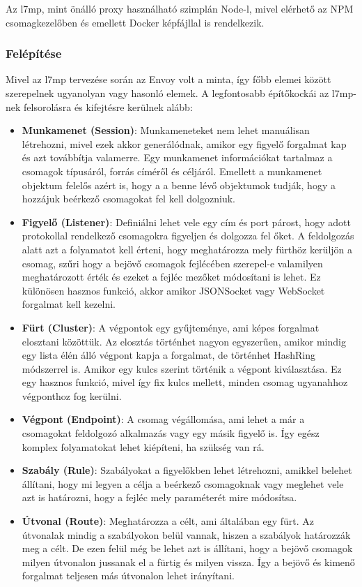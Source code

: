 Az l7mp, mint önálló proxy használható szimplán Node-l, mivel elérhető az NPM
csomagkezelőben és emellett Docker képfájllal is rendelkezik. 

\subsubsection{Felépítése}

Mivel az l7mp tervezése során az Envoy volt a minta, így főbb elemei között szerepelnek
ugyanolyan vagy hasonló elemek. A legfontosabb építőkockái az l7mp-nek 
felsorolásra és kifejtésre kerülnek alább: 

\begin{itemize}
	\item \textbf{Munkamenet (Session)}: Munkameneteket nem lehet manuálisan létrehozni,
	mivel ezek akkor generálódnak, amikor egy figyelő forgalmat kap és azt 
	továbbítja valamerre. Egy munkamenet információkat tartalmaz a csomagok típusáról,
	forrás címéről és céljáról. Emellett a munkamenet objektum felelős azért is, hogy a
	a benne lévő objektumok tudják, hogy a hozzájuk beérkező csomagokat fel kell dolgozniuk. 
	\item \textbf{Figyelő (Listener)}: Definiálni lehet vele egy cím és port párost, hogy
	adott protokollal rendelkező csomagokra figyeljen és dolgozza fel őket. A feldolgozás
	alatt azt a folyamatot kell érteni, hogy meghatározza mely fürthöz kerüljön a csomag,
	szűri hogy a bejövő csomagok fejlécében szerepel-e valamilyen meghatározott érték és 
	ezeket a fejléc mezőket módosítani is lehet. Ez különösen hasznos funkció, akkor 
	amikor JSONSocket vagy WebSocket forgalmat kell kezelni. 
	\item \textbf{Fürt (Cluster)}: A végpontok egy gyűjteménye, ami képes forgalmat elosztani
	közöttük. Az elosztás történhet nagyon egyszerűen, amikor mindig egy lista élén álló
	végpont kapja a forgalmat, de történhet HashRing módszerrel is. Amikor egy kulcs szerint
	történik a végpont kiválasztása. Ez egy hasznos funkció, mivel így fix kulcs mellett,
	minden csomag ugyanahhoz végponthoz fog kerülni. 
	\item \textbf{Végpont (Endpoint)}: A csomag végállomása, ami lehet a már a csomagokat
	feldolgozó alkalmazás vagy egy másik figyelő is. Így egész komplex folyamatokat 
	lehet kiépíteni, ha szükség van rá. 
	\item \textbf{Szabály (Rule)}: Szabályokat a figyelőkben lehet létrehozni, amikkel
	belehet állítani, hogy mi legyen a célja a beérkező csomagoknak vagy meglehet vele azt
	is határozni, hogy a fejléc mely paraméterét mire módosítsa. 
	\item \textbf{Útvonal (Route)}: Meghatározza a célt, ami általában egy fürt. Az 
	útvonalak mindig a szabályokon belül vannak, hiszen a szabályok határozzák meg a célt.
	De ezen felül még be lehet azt is állítani, hogy a bejövő csomagok milyen útvonalon 
	jussanak el a fürtig és milyen vissza. Így a bejövő és kimenő forgalmat teljesen 
	más útvonalon lehet irányítani.
\end{itemize}


